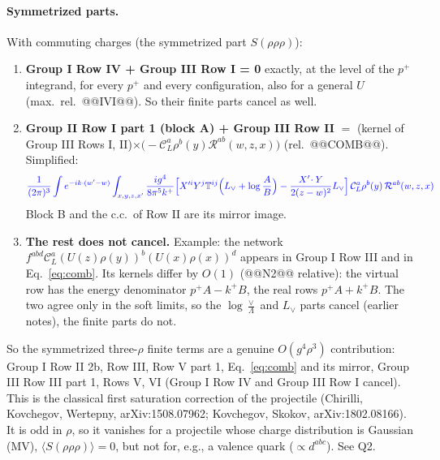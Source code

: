 \documentclass[10pt]{article}
\numberwithin{equation}{section}
\newcommand{\new}[1]{{\color{blue}#1}}
\newcommand{\Lv}{L_{\vee}}
\newcommand{\CL}{\mathcal C_L}
\newcommand{\Rc}{\mathcal R}
\newcommand{\pre}{\frac{1}{(2\pi)^3}}
\newcommand{\phw}{e^{-ik\cdot(w'-w)}}
\begin{document}
\paragraph{Symmetrized parts.} With commuting charges (the symmetrized part $S(\rho\rho\rho)$):
\begin{enumerate}
\item \textbf{Group I Row IV + Group III Row I = 0} exactly, at the level of the $p^+$ integrand, for every $p^+$ and every configuration, also for a general $U$ (max.\ rel.\ @@IVI@@). So their finite parts cancel as well.
\item \textbf{Group II Row I part 1 (block A) + Group III Row II} $=$ (kernel of Group III Rows I, II)$\times\big(-\CL^a\rho^b(y)\Rc^{ab}(w,z,x)\big)$ (rel.\ @@COMB@@). Simplified:
\begin{equation}
\new{\pre\int\phw\int_{x,y,z,x'}\frac{ig^4}{8\pi^5k^+}\Big[X'^iY^j\mathbb T^{ij}\Big(\Lv+\log\frac AB\Big)-\frac{X'\!\cdot Y}{2(z-w)^2}\Lv\Big]\,\CL^a\rho^b(y)\,\Rc^{ab}(w,z,x)}
\label{eq:comb}
\end{equation}
Block B and the c.c.\ of Row II are its mirror image.
\item \textbf{The rest does not cancel.} Example: the network $f^{abd}\CL^a(U(z)\rho(y))^b(U(x)\rho(x))^d$ appears in Group I Row III and in Eq.~\eqref{eq:comb}. Its kernels differ by $O(1)$ (@@N2@@ relative): the virtual row has the energy denominator $p^+A-k^+B$, the real rows $p^+A+k^+B$. The two agree only in the soft limits, so the $\log\frac\vee\Lambda$ and $\Lv$ parts cancel (earlier notes), the finite parts do not.
\end{enumerate}
So the symmetrized three-$\rho$ finite terms are a genuine $O(g^4\rho^3)$ contribution: Group I Row II 2b, Row III, Row V part 1, Eq.~\eqref{eq:comb} and its mirror, Group III Row III part 1, Rows V, VI (Group I Row IV and Group III Row I cancel). This is the classical first saturation correction of the projectile (Chirilli, Kovchegov, Wertepny, arXiv:1508.07962; Kovchegov, Skokov, arXiv:1802.08166). It is odd in $\rho$, so it vanishes for a projectile whose charge distribution is Gaussian (MV), $\langle S(\rho\rho\rho)\rangle=0$, but not for, e.g., a valence quark ($\propto d^{abc}$). See Q2.
\end{document}
